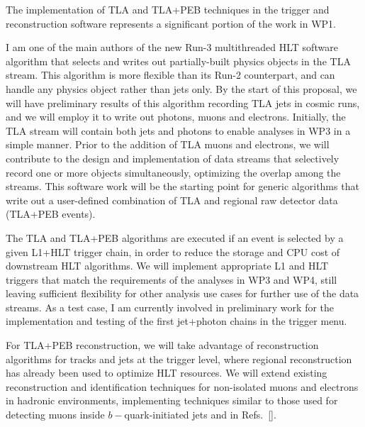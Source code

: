 The implementation of TLA and TLA+PEB techniques in the trigger and reconstruction software represents a significant portion of the work in WP1. 

I am one of the 
main authors of the new Run-3 multithreaded HLT software algorithm that selects and writes out partially-built physics objects in the TLA stream. 
This algorithm is more flexible than its Run-2 counterpart, and can handle any physics object rather than jets only. 
By the start of this proposal, we will have preliminary results of this algorithm recording TLA jets in cosmic runs, and we will employ it to write out photons, muons and electrons.  
Initially, the TLA stream will contain both jets and photons to enable analyses in WP3 in a simple manner. 
Prior to the addition of TLA muons and electrons, we will contribute to the design and implementation of data streams that selectively record one or more objects simultaneously, optimizing the overlap among the streams. 
This software work will be the starting point for generic algorithms that write out a user-defined combination of TLA and regional raw detector data (TLA+PEB events). 

The TLA and TLA+PEB algorithms are executed if an event is selected by a given L1+HLT trigger chain, in order to reduce the storage and CPU cost of downstream HLT algorithms. 
We will implement appropriate L1 and HLT triggers that match the requirements of the analyses in WP3 and WP4, still leaving sufficient flexibility for other analysis use cases for further use of the data streams. 
As a test case, I am currently involved in preliminary work for the implementation and testing of the first jet+photon chains in the trigger menu. 

For TLA+PEB reconstruction, we will take advantage of reconstruction algorithms for tracks and jets at the trigger level, where regional reconstruction has already been used to optimize HLT resources. 
We will extend existing reconstruction and identification techniques for non-isolated muons and electrons in hadronic environments, implementing techniques similar to those used for detecting muons inside $b-$quark-initiated jets and in Refs.~\ref{}. 



